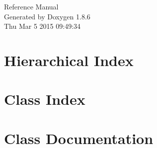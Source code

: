 \documentclass[twoside]{book}
\newcommand{\clearemptydoublepage}{%
  \newpage{\pagestyle{empty}\cleardoublepage}%
}
\begin{document}
\hypersetup{pageanchor=false}
\begin{titlepage}
\vspace*{7cm}
\begin{center}%
{\Large Reference Manual}\\
\vspace*{1cm}
{\large Generated by Doxygen 1.8.6}\\
\vspace*{0.5cm}
{\small Thu Mar 5 2015 09:49:34}\\
\end{center}
\end{titlepage}
\clearemptydoublepage
\tableofcontents
\clearemptydoublepage
{}
\hypersetup{pageanchor=true}

\chapter{Hierarchical Index}

\chapter{Class Index}

\chapter{Class Documentation}






















\newpage
{}
{}
\printindex
\end{document}
